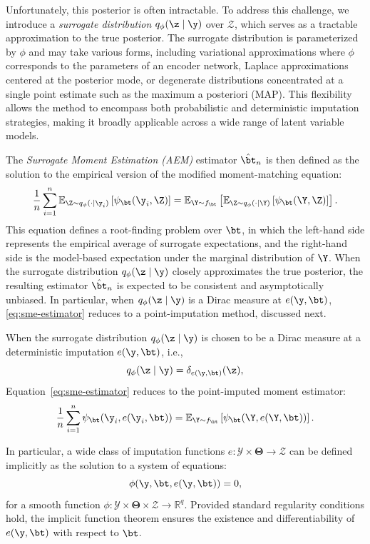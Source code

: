 Unfortunately, this posterior is often intractable. To address this challenge, we introduce a \emph{surrogate distribution} $q_\phi(\z \mid \y)$ over $\mathcal{Z}$, which serves as a tractable approximation to the true posterior. The surrogate distribution is parameterized by $\phi$ and may take various forms, including variational approximations where $\phi$ corresponds to the parameters of an encoder network, Laplace approximations centered at the posterior mode, or degenerate distributions concentrated at a single point estimate such as the maximum a posteriori (MAP). This flexibility allows the method to encompass both probabilistic and deterministic imputation strategies, making it broadly applicable across a wide range of latent variable models.

The \emph{Surrogate Moment Estimation (AEM)} estimator $\hat\bt_n$ is then defined as the solution to the empirical version of the modified moment-matching equation:
\begin{equation}
\frac{1}{n} \sum_{i=1}^n \mathbb{E}_{\Z \sim q_\phi(\cdot \mid \y_i)} \left[ \psi_\bt(\y_i, \Z) \right]
=
\mathbb{E}_{\Y \sim f_\bt}
\left[
\mathbb{E}_{\Z \sim q_\phi(\cdot \mid \Y)} 
\left[ 
\psi_\bt(\Y, \Z)
\right]
\right].
\end{equation}
This equation defines a root-finding problem over $\bt$, in which the left-hand side represents the empirical average of surrogate expectations, and the right-hand side is the model-based expectation under the marginal distribution of $\Y$. When the surrogate distribution $q_\phi(\z \mid \y)$ closely approximates the true posterior, the resulting estimator $\hat\bt_n$ is expected to be consistent and asymptotically unbiased. In particular, when $q_\phi(\z \mid \y)$ is a Dirac measure at $e(\y, \bt)$, \eqref{eq:sme-estimator} reduces to a point-imputation method, discussed next.





When the surrogate distribution $q_\phi(\z \mid \y)$ is chosen to be a Dirac measure at a deterministic imputation $e(\y, \bt)$, i.e.,
\[
q_\phi(\z \mid \y) = \delta_{e(\y, \bt)}(\z),
\]
Equation~\eqref{eq:sme-estimator} reduces to the point-imputed moment estimator:
\begin{equation}
\label{eq:imputed-estimator}
\frac{1}{n} \sum_{i=1}^n \psi_\bt(\y_i, e(\y_i, \bt)) 
= 
\mathbb{E}_{\Y \sim f_\bt} 
\left[ 
\psi_\bt(\Y, e(\Y, \bt)) 
\right].
\end{equation}

In particular, a wide class of imputation functions $e : \mathcal{Y} \times \bm{\Theta} \to \mathcal{Z}$ can be defined implicitly as the solution to a system of equations:
\begin{equation}
\label{def:e:implicit}
\phi(\y, \bt, e(\y, \bt)) = 0,
\end{equation}
for a smooth function $\phi : \mathcal{Y} \times \bm{\Theta} \times \mathcal{Z} \to \mathbb{R}^q$. Provided standard regularity conditions hold, the implicit function theorem ensures the existence and differentiability of $e(\y, \bt)$ with respect to $\bt$.



